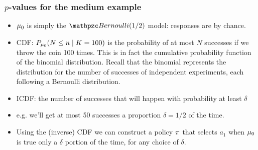 \begin{frame}\frametitle{$p$-values for the medium example}
  \begin{itemize}
  \item<2->$\mu_0$ is simply the $\Bernoulli(1/2)$ model:
    responses are by chance. 
  \item<3->CDF: $P_{\mu_0}(N \leq n \mid K = 100)$  {is the probability of at most $N$ successes if we throw the coin 100 times. This is in fact the cumulative probability function of the binomial distribution. Recall that the binomial represents the distribution for the number of successes of independent experiments, each following a Bernoulli distribution.}
  \item<4->ICDF:  the number of successes that will happen with probability at least $\delta$
  \item<5->e.g. we'll get at most 50 successes a proportion $\delta = 1/2$ of the time.
  \item<6>Using the (inverse) CDF we can construct a policy $\pi$ that selects $a_1$ when $\mu_0$ is true only a $\delta$ portion of the time, for any choice of $\delta$.
  \end{itemize}
  \begin{columns}
    \setlength{}
    \setlength{}
    \begin{column}{0.5\textwidth}
    \end{column}
    \begin{column}{0.5\textwidth}
    \end{column}
  \end{columns}    
\end{frame}



